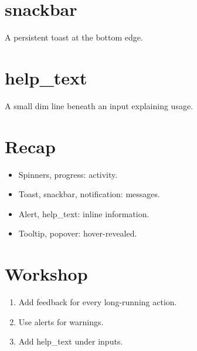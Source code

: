 \section{snackbar}

A persistent toast at the bottom edge.

\section{help\_text}

A small dim line beneath an input explaining usage.

\section{Recap}

\begin{recap}
\begin{itemize}[leftmargin=*]
  \item Spinners, progress: activity.
  \item Toast, snackbar, notification: messages.
  \item Alert, help\_text: inline information.
  \item Tooltip, popover: hover-revealed.
\end{itemize}
\end{recap}

\section*{Workshop}

\begin{enumerate}[leftmargin=*]
  \item Add feedback for every long-running action.
  \item Use alerts for warnings.
  \item Add help\_text under inputs.
\end{enumerate}
